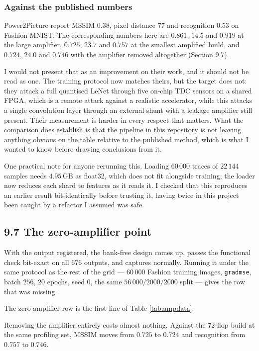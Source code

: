 \documentclass[11pt,a4paper]{article}
\begin{document}
\subsubsection*{Against the published numbers}

Power2Picture report MSSIM $0.38$, pixel distance $77$ and recognition $0.53$ on
Fashion-MNIST. The corresponding numbers here are $0.861$, $14.5$ and $0.919$ at the large
amplifier, $0.725$, $23.7$ and $0.757$ at the smallest amplified build, and $0.724$,
$24.0$ and $0.746$ with the amplifier removed altogether (Section 9.7).

I would not present that as an improvement on their work, and it should not be read as
one. The training protocol now matches theirs, but the target does not: they attack a full
quantised LeNet through five on-chip TDC sensors on a shared FPGA, which is a remote attack
against a realistic accelerator, while this attacks a single convolution layer through an
external shunt with a leakage amplifier still present. Their measurement is harder in every
respect that matters. What the comparison does establish is that the pipeline in this
repository is not leaving anything obvious on the table relative to the published method,
which is what I wanted to know before drawing conclusions from it.

One practical note for anyone rerunning this. Loading $60\,000$ traces of $22\,144$ samples
needs $4.95$\,GB as float32, which does not fit alongside training; the loader now reduces
each shard to features as it reads it. I checked that this reproduces an earlier result
bit-identically before trusting it, having twice in this project been caught by a
refactor I assumed was safe.



\subsection*{9.7 The zero-amplifier point}

With the output registered, the bank-free design comes up, passes the functional check
bit-exact on all $676$ outputs, and captures normally. Running it under the same protocol
as the rest of the grid --- $60\,000$ Fashion training images, \texttt{gradmse}, batch
$256$, $20$ epochs, seed $0$, the same $56\,000/2000/2000$ split --- gives the row that was
missing.

The zero-amplifier row is the first line of Table \ref{tab:ampdata}.

Removing the amplifier entirely costs almost nothing. Against the $72$-flop build at the
same profiling set, MSSIM moves from $0.725$ to $0.724$ and recognition from $0.757$ to
$0.746$.
\end{document}

